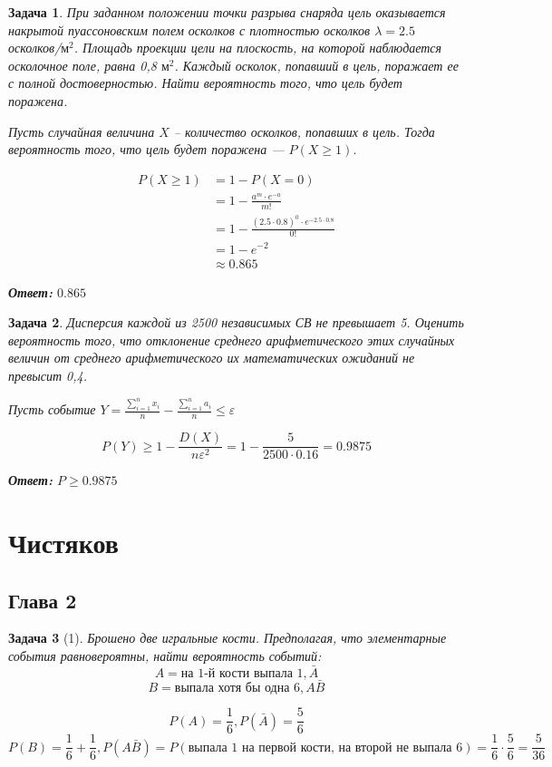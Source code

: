 \documentclass{article}
\theoremstyle{problemstyle}
\newtheorem{problem}{Задача}[section]
\begin{document}
\begin{problem}
    При заданном положении точки разрыва снаряда
    цель оказывается накрытой пуассоновским полем осколков с
    плотностью осколков   $\lambda = 2.5$ осколков/$\text{м}^2$. Площадь проекции цели
    на плоскость, на которой наблюдается осколочное поле, равна
    0,8 $\text{м}^2$. Каждый осколок, попавший в цель, поражает ее с полной достоверностью.
    Найти вероятность того, что цель будет поражена.

    Пусть случайная величина $X$ -- количество осколков, попавших
    в цель. Тогда вероятность того, что цель будет поражена --- $P(X \geq 1)$.

    \begin{align*}
        P(X \geq 1) &= 1 - P(X = 0) \\
                    &= 1 - \frac{a^m \cdot e^{-a}}{m!} \\
                    &= 1 - \frac{(2.5 \cdot 0.8)^{0} \cdot e^{- 2.5 \cdot 0.8}}{0!} \\
                    &= 1 - e^{-2} \\
                    &\approx 0.865
    \end{align*}

    \textbf{Ответ:} $0.865$
\end{problem}

\begin{problem}
    Дисперсия каждой из 2500 независимых СВ не превышает 5.
    Оценить вероятность того, что отклонение среднего
    арифметического этих случайных величин от среднего арифметического их
    математических ожиданий не превысит 0,4.

    Пусть событие $Y = \frac{\sum\limits_{i=1}^n x_i}{n} - \frac{\sum\limits_{i=1}^n a_i}{n} \leq \varepsilon$

    \[
        P\left( Y \right) \geq 1 - \frac{D(X)}{n \varepsilon^2}
        = 1 - \frac{5}{2500 \cdot 0.16}
        = 0.9875
    \]

    \textbf{Ответ:} $P \geq 0.9875$
\end{problem}

\section{Чистяков}
\subsection{Глава 2}
\begin{problem}[1]
    Брошено две игральные кости.
    Предполагая, что элементарные события равновероятны,
    найти вероятность событий:
    \[ A = {\text{на 1-й кости выпала 1}}, \bar A \]
    \[ B = {\text{выпала хотя бы одна 6}}, A \bar B \]

    \[
        P(A) = \frac{1}{6}, P(\bar A) = \frac{5}{6}
    \]
    \[
        P(B) = \frac{1}{6} + \frac{1}{6}, P(A \bar B) = P(\text{выпала 1 на первой кости, на второй не выпала 6}) = \frac{1}{6} \cdot \frac {5}{6} = \frac{5}{36}
    \]
\end{problem}
\end{document}
